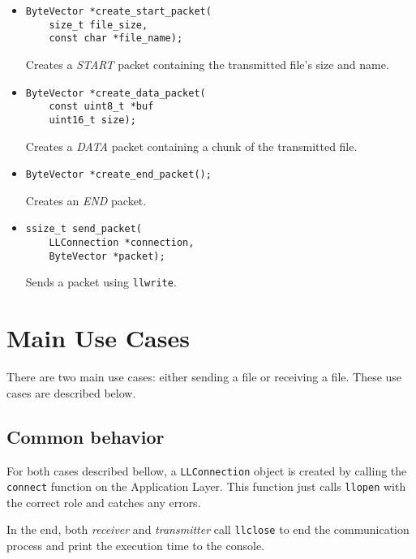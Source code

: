 \documentclass[11pt,a4paper,twocolumn]{article}
\begin{document}
\begin{itemize}
    \item \begin{lstlisting}
ByteVector *create_start_packet(
    size_t file_size, 
    const char *file_name);
    \end{lstlisting}

          Creates a \textit{START} packet containing the transmitted file's size and name.

    \item \begin{lstlisting}
ByteVector *create_data_packet(
    const uint8_t *buf
    uint16_t size);
    \end{lstlisting}

          Creates a \textit{DATA} packet containing a chunk of the transmitted file.

    \item \begin{lstlisting}
ByteVector *create_end_packet();
    \end{lstlisting}

          Creates an \textit{END} packet.

    \item \begin{lstlisting}
ssize_t send_packet(
    LLConnection *connection,
    ByteVector *packet);
    \end{lstlisting}

          Sends a packet using \lstinline{llwrite}.

\end{itemize}

\section{Main Use Cases}

There are two main use cases: either sending a file or receiving a file.
These use cases are described below.

\subsection{Common behavior}

For both cases described bellow, a \lstinline{LLConnection} object is created by calling the \lstinline{connect} function on the Application Layer. This function just calls \lstinline{llopen} with the correct role and catches any errors.

In the end, both \textit{receiver} and \textit{transmitter} call \lstinline{llclose} to end the communication process and print the execution time to the console.
\end{document}
